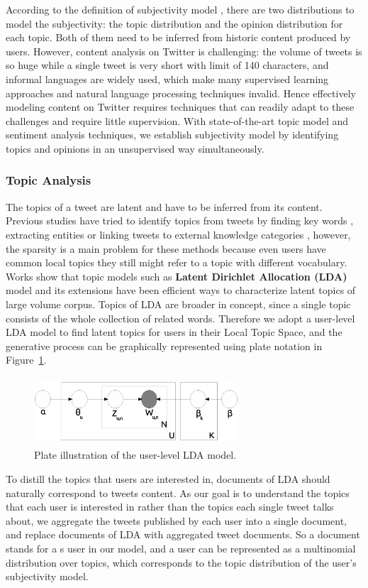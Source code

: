 \documentclass[twocolumn]{svjour3}          %
\begin{document}
According to the definition of subjectivity model , there are two distributions to model the subjectivity: the topic distribution and the opinion distribution for each topic. Both of them need to be inferred from historic content produced by users.
However, content analysis on Twitter is challenging: the volume of tweets is so huge while a single tweet is very short with limit of 140 characters, and informal languages are widely used, which make many supervised learning approaches and natural language processing techniques invalid. 
Hence effectively modeling content on Twitter requires techniques that can readily adapt to these challenges and require little supervision. 
With state-of-the-art topic model and sentiment analysis techniques, we establish subjectivity model by identifying topics and opinions in an unsupervised way simultaneously. 

\subsubsection{Topic Analysis}
\label{topic}

The topics of a tweet are latent and have to be inferred from its content.
Previous studies have tried to identify topics from tweets by finding key words \cite{Chen:2010STE}, extracting  entities \cite{Abel:2011AUM} or linking tweets to external knowledge categories \cite{conf/icwsm/MacskassyM11}, however, the sparsity is a main problem for these methods because even users have common local topics they still might refer to a topic with different vocabulary.
Works show that topic models such as \textbf{Latent Dirichlet Allocation (LDA)} model and its extensions\cite{blei2003latent,conf/wsdm/WengLJH10} have been efficient ways to characterize latent topics of large volume corpus.  
Topics of LDA are broader in concept, since a single topic consists of the whole collection of related words. 
Therefore we adopt a user-level LDA model to find latent topics for users in their Local Topic Space, and the generative process can be graphically represented using plate notation in Figure~\ref{fig1}.
\begin{figure}[htb]
\centering
\includegraphics[width=3.0in,height=1.0in]{fig1.eps}
\caption{Plate illustration of the user-level LDA model.}
\label{fig1}
\end{figure}
To distill the topics that users are interested in, documents of LDA should naturally correspond to tweets content. 
As our goal is to understand the topics that each user is interested in rather than the topics each single tweet talks about, we aggregate the tweets published by each user into a single document, and replace documents of LDA with aggregated tweet documents. 
So a document stands for a s user in our model, and a user can be represented as a multinomial distribution over topics, which corresponds to the topic distribution of the user's subjectivity model.
\end{document}
